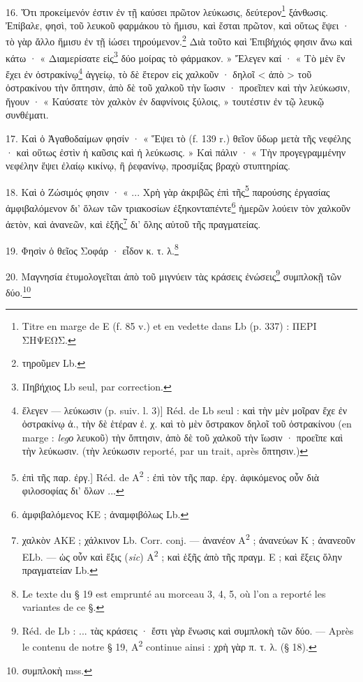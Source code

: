 \documentclass[landscape, a4paper, 11pt, oneside, polutonikogreek, french]{article}
\begin{document}
\paragraph{}
16. Ὅτι προκείμενόν ἐστιν ἐν τῇ καύσει πρῶτον λεύκωσις, δεύτερον\footnote{Titre en marge de E (f. 85 v.) et en vedette dans Lb (p. 337) : ΠΕΡΙ ΣΗΨΕΩΣ.} ξάνθωσις. Ἐπίβαλε, φησὶ, τοῦ λευκοῦ φαρμάκου τὸ ἥμισυ, καὶ ἔσται πρῶτον, καὶ οὕτως ἕψει · τὸ γὰρ ἄλλο ἥμισυ ἐν τῇ ἰώσει τηρούμενον.\footnote{τηροῦμεν Lb.} Διὰ τοῦτο καὶ Ἐπιβήχιός φησιν ἄνω καὶ κάτω · « Διαμερίσατε εἰς\footnote{Πηβήχιος Lb seul, par correction.} δύο μοίρας τὸ φάρμακον. » Ἔλεγεν καί · « Τὸ μὲν ἓν ἔχει ἐν ὀστρακίνῳ\footnote{ἔλεγεν --- λεύκωσιν (p. suiv. l. 3)] Réd. de Lb seul : καὶ τὴν μὲν μοῖραν ἔχε ἐν ὀστρακίνῳ ἀ., τὴν δὲ ἑτέραν ἐ. χ. καὶ τὸ μὲν ὄστρακον δηλοῖ τοῦ ὀστρακίνου (en marge : \emph{legο} λευκοῦ) τὴν ὄπτησιν, ἀπὸ δὲ τοῦ χαλκοῦ τὴν ἴωσιν · προεῖπε καὶ τὴν λεύκωσιν. (τὴν λεύκωσιν reporté, par un trait, après ὄπτησιν.)} ἀγγείῳ, τὸ δὲ ἕτερον εἰς χαλκοῦν · δηλοῖ < ἀπὸ > τοῦ ὀστρακίνου τὴν ὄπτησιν, ἀπὸ δὲ τοῦ χαλκοῦ τὴν ἴωσιν · προεῖπεν καὶ τὴν λεύκωσιν, ἤγουν · « Καύσατε τὸν χαλκὸν ἐν δαφνίνοις ξύλοις, » τουτέστιν ἐν τῷ λευκῷ συνθέματι.

17. Καὶ ὁ Ἀγαθοδαίμων φησίν · « Ἕψει τὸ (f. 139 r.) θεῖον ὕδωρ μετὰ τῆς νεφέλης · καὶ οὕτως ἐστὶν ἡ καῦσις καὶ ἡ λεύκωσις. » Καὶ πάλιν · « Τὴν προγεγραμμένην νεφέλην ἕψει ἐλαίῳ κικίνῳ, ἢ ῥεφανίνῳ, προσμίξας βραχὺ στυπτηρίας.

18. Καὶ ὁ Ζώσιμός φησιν · « ... Χρὴ γὰρ ἀκριβῶς ἐπὶ τῆς\footnote{ἐπὶ τῆς παρ. ἐργ.] Réd. de A\textsuperscript{2} : ἐπὶ τὸν τῆς παρ. ἐργ. ἀφικόμενος οὖν διὰ φιλοσοφίας δι' ὅλων ...} παρούσης ἐργασίας ἀμφιβαλόμενον δι' ὅλων τῶν τριακοσίων ἐξηκονταπέντε\footnote{ἀμφιβαλόμενος KE ; ἀναμφιβόλως Lb.} ἡμερῶν λούειν τὸν χαλκοῦν ἀετὸν, καὶ ἀνανεῶν, καὶ ἑξῆς\footnote{χαλκὸν AKE ; χάλκινον Lb. Corr. conj. --- ἀνανέον A\textsuperscript{2} ; ἀνανεύων K ; ἀνανεοῦν ELb. --- ὡς οὖν καὶ ἔξις (\emph{sic}) A\textsuperscript{2} ; καὶ ἑξῆς ἀπὸ τῆς πραγμ. E ; καὶ ἕξεις ὅλην πραγματείαν Lb.} δι' ὅλης αὐτοῦ τῆς πραγματείας.

19. Φησὶν ὁ θεῖος Σοφάρ · εἶδον κ. τ. λ.\footnote{Le texte du § 19 est emprunté au morceau 3, 4, 5, où l'on a reporté les variantes de ce §.}

20. Μαγνησία ἐτυμολογεῖται ἀπὸ τοῦ μιγνύειν τὰς κράσεις ἐνώσεις\footnote{Réd. de Lb : ... τὰς κράσεις · ἔστι γὰρ ἕνωσις καὶ συμπλοκὴ τῶν δύο. --- Après le contenu de notre § 19, A\textsuperscript{2} continue ainsi : χρὴ γὰρ π. τ. λ. (§ 18).} συμπλοκῇ τῶν δύο.\footnote{συμπλοκὴ mss.}
\end{document}
